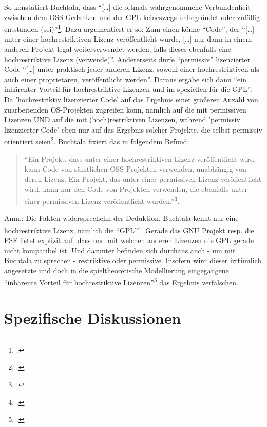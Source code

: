 \documentclass[DIV=calc,BCOR=5mm,11pt,headings=small,oneside,abstract=true, toc=bib]{scrartcl}
\begin{document}
So konstatiert Buchtala, dass \enquote{[\ldots] die oftmals wahrgenommene
Verbundenheit zwischen dem OSS-Gedanken und der GPL keineswegs unbegründet oder
zufällig entstanden (sei)}\footcite[cf.][168]{Buchtala2007a}. Dazu
argumentiert er so: Zum einen könne \enquote{Code}, der \enquote{[\ldots]
unter einer hochrestriktiven Lizenz veröffentlicht wurde, [\ldots] nur dann in
einem anderen Projekt legal weiterverwendet werden, falls dieses ebenfalls eine
hochrestriktive Lizenz (verwende)}. Andererseits dürfe
\enquote{permissiv} lizenzierter Code \enquote{[\ldots] unter praktisch jeder
anderen Lizenz, sowohl einer hochrestriktiven als auch einer proprietären,
veröffentlicht werden}. Daraus ergäbe sich dann \enquote{ein inhärenter
Vorteil für hochrestriktive Lizenzen und im speziellen für die GPL}: Da
'hochrestriktiv lizenzierter Code' auf das Ergebnis einer größeren Anzahl von
zuarbeitenden OS-Projekten zugreifen könn, nämlich auf die mit permissiven
Lizenzen UND auf die mit (hoch)restriktiven Lizenzen, während 'permissiv
lizenzierter Code' eben nur auf das Ergebnis solcher Projekte, die
selbst permissiv orientiert seien\footcite[cf.][165]{Buchtala2007a}. Buchtala
fixiert das in folgendem Befund:
\begin{quotation}\noindent
\enquote{Ein Projekt, dass unter einer hochrestriktiven Lizenz veröffentlicht
wird, kann Code von sämtlichen OSS Projekten verwenden, unabhängig von deren Lizenz. Ein
Projekt, das unter einer permissiven Lizenz veröffentlicht wird, kann nur den
Code von Projekten verwenden, die ebenfalls unter einer permissiven Lizenz
veröffentlicht wurden.}\footcite[][165]{Buchtala2007a}.
\end{quotation}

Anm.: Die Fakten widersprechehn der Deduktion. Buchtala kennt nur eine
hochrestriktive Lizenz, nämlich die
\enquote{GPL}\footcite[cf.][62]{Buchtala2007a}. Gerade das GNU Projekt resp. die
FSF listet explizit auf, dass und mit welchen anderen Lizenzen die GPL gerade
nicht kompatibel ist. Und darunter befinden sich durchaus auch - um mit Buchtala
zu sprechen - restriktive oder permissive. Insofern wird dieser irrtümlich
angesetzte und doch in die spieltheoretische Modellierung eingegangene
\enquote{inhärente Vorteil für hochrestriktive
Lizenzen}\footcite[cf.][168]{Buchtala2007a} das Ergebnis
verfälschen.

\section{Spezifische Diskussionen}
\end{document}
